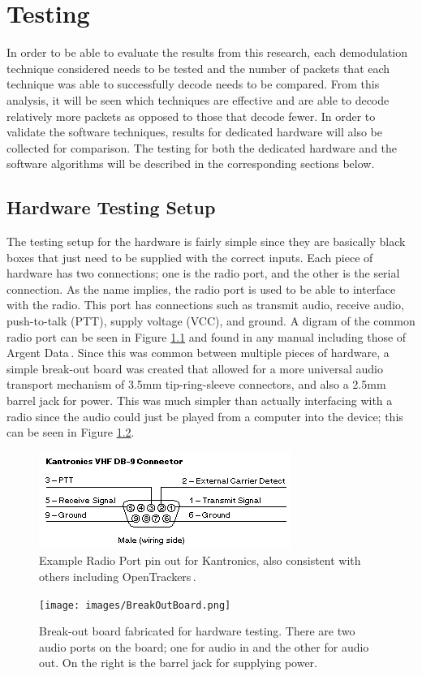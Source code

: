 \chapter{Testing}
In order to be able to evaluate the results from this research, each demodulation technique considered needs to be tested and the number of packets that each technique was able to successfully decode needs to be compared. From this analysis, it will be seen which techniques are effective and are able to decode relatively more packets as opposed to those that decode fewer. In order to validate the software techniques, results for dedicated hardware will also be collected for comparison. The testing for both the dedicated hardware and the software algorithms will be described in the corresponding sections below.

\section{Hardware Testing Setup}
The testing setup for the hardware is fairly simple since they are basically black boxes that just need to be supplied with the correct inputs. Each piece of hardware has two connections; one is the radio port, and the other is the serial connection. As the name implies, the radio port is used to be able to interface with the radio. This port has connections such as transmit audio, receive audio, push-to-talk (PTT), supply voltage (VCC), and ground. A digram of the common radio port can be seen in Figure \ref{RadioPortPinout} and found in any manual including those of Argent Data\,\cite{Systems2013}. Since this was common between multiple pieces of hardware, a simple break-out board was created that allowed for a more universal audio transport mechanism of 3.5mm tip-ring-sleeve connectors, and also a 2.5mm barrel jack for power. This was much simpler than actually interfacing with a radio since the audio could just be played from a computer into the device; this can be seen in Figure \ref{BreakOutBoard}. 

\begin{figure}
  \centering
	\includegraphics[width=0.75\linewidth]{images/RadioPortPinout.png} 
	\caption{Example Radio Port pin out for Kantronics, also consistent with others including OpenTrackers\,\cite{Martin2014}.}
   \label{RadioPortPinout}
\end{figure}
\begin{figure}
  \centering
	\texttt{[image: images/BreakOutBoard.png]} 
	\caption{Break-out board fabricated for hardware testing. There are two audio ports on the board; one for audio in and the other for audio out. On the right is the barrel jack for supplying power.}
   \label{BreakOutBoard}
\end{figure}

